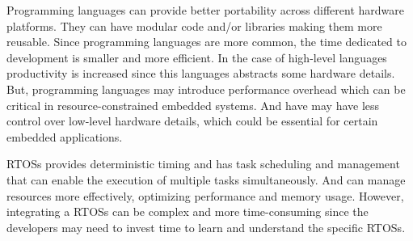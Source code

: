 Programming languages can provide better portability across different hardware platforms.
They can have modular code and/or libraries making them more reusable.
Since programming languages are more common, the time dedicated to development is smaller and more efficient.
In the case of high-level languages productivity is increased since this languages abstracts some hardware details.
But, programming languages may introduce performance overhead which can be critical in resource-constrained embedded systems.
And have may have less control over low-level hardware details, which could be essential for certain embedded applications.


\glspl{RTOS} provides deterministic timing and has task scheduling and management that can enable the execution of multiple tasks simultaneously.
And can manage resources more effectively, optimizing performance and memory usage.
However, integrating a \glspl{RTOS} can be complex and more time-consuming since the developers may need to invest time to learn and understand the specific \glspl{RTOS}.






